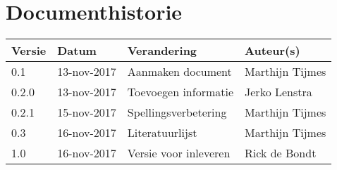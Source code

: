 \section{Documenthistorie}

\begin{tabularx}{\textwidth}{| l | l | X | l |}
	\hline
	\textbf{Versie} & \textbf{Datum} & \textbf{Verandering} & \textbf{Auteur(s)} \\ \hline
	0.1	& 13-nov-2017 & Aanmaken document & Marthijn Tijmes \\ \hline
    0.2.0 & 13-nov-2017 & Toevoegen informatie & Jerko Lenstra \\ \hline
    0.2.1 & 15-nov-2017 & Spellingsverbetering & Marthijn Tijmes \\ \hline
    0.3 & 16-nov-2017 & Literatuurlijst & Marthijn Tijmes \\ \hline
    1.0 & 16-nov-2017 & Versie voor inleveren & Rick de Bondt \\ \hline

\end{tabularx}
